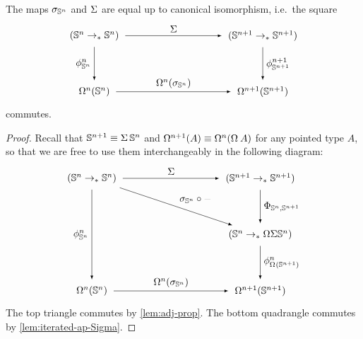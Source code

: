 \documentclass[english,a4]{article}
\begin{document}
\begin{lemma} \label{lem:sigma-susp}
  The maps $\sigma_{{\mathbb S^{n}}}$ and $\operatorname{\Sigma}$ are equal up to canonical isomorphism, i.e.\ the square
  \begin{equation} \label{eq:needs-to-commute}
    \begin{tikzpicture}[x=6cm,y=-2cm,baseline=(current bounding box.center)]
    \tikzset{arrow/.style={shorten >=0.1cm,shorten <=.1cm,-latex}}
    \node (A) at (0,0) {$(\Sn n \to_* \Sn n)$}; 
    \node (B) at (0,1) {$\Omega^n(\Sn n)$}; 
    \node (C) at (1,1) {$\Omega^{n+1}(\Sn {n+1})$}; 
    \node (D) at (1,0) {$(\Sn {n+1} \to_* \Sn {n+1})$}; 
    
    \draw[arrow] (A) to node [left] {$\phi_{\Sn n}^n$} (B);
    \draw[arrow] (B) to node [above] {$\Omega^n(\sigma_{\Sn n})$} (C);
    \draw[arrow] (D) to node [right] {$\phi_{\Sn {n+1}}^{n+1}$} (C);
    \draw[arrow] (A) to node [above] {$\susp$} (D);
    \end{tikzpicture}
  \end{equation}
  commutes.
\end{lemma}
\begin{proof}%
  Recall that ${\mathbb S^{n+1}} \equiv \operatorname{\Sigma} {{\mathbb S^{n}}}$ and $\loopspace {n+1}(A) \jdeq
  \loopspace n (\loopspace\null A)$ for any pointed type $A$, so that we are
  free to use them interchangeably
  in the following diagram:
\begin{equation}
\begin{tikzpicture}[x=6cm,y=-2cm,baseline=(current bounding box.center)]
\tikzset{arrow/.style={shorten >=0.1cm,shorten <=.1cm,-latex}}
\node (A) at (0,0) {$(\Sn n \to_* \Sn n)$}; 
\node (B) at (0,2) {$\Omega^n(\Sn n)$}; 
\node (C) at (1,2) {$\Omega^{n+1}(\Sn {n+1})$}; 
\node (D) at (1,0) {$(\Sn {n+1} \to_* \Sn {n+1})$}; 
\node (E) at (1,1) {$(\Sn n \to_* \Omega \Sigma \Sn n)$};

\draw[arrow] (A) to node [left] {$\phi^n_{\Sn n}$} (B);
\draw[arrow] (B) to node [above] {$\loopspace n(\sigma_{\Sn n})$} (C);
\draw[arrow] (A) to node [above] {$\susp$} (D);
\draw[arrow] (D) to node [right] {$\Phi_{\Sn n,\Sn {n+1}}$} (E);
\draw[arrow] (E) to node [right] {$\phi^n_{\loopspace\null(\Sn {n+1})}$} (C);
\draw[arrow] (A) to node [above right] {$\sigma_{\Sn n} \circ \blank$} (E);
\end{tikzpicture}
\end{equation}
The top triangle commutes by \cref{lem:adj-prop}.
The bottom quadrangle commutes by \cref{lem:iterated-ap-Sigma}.
\end{proof}
\end{document}
